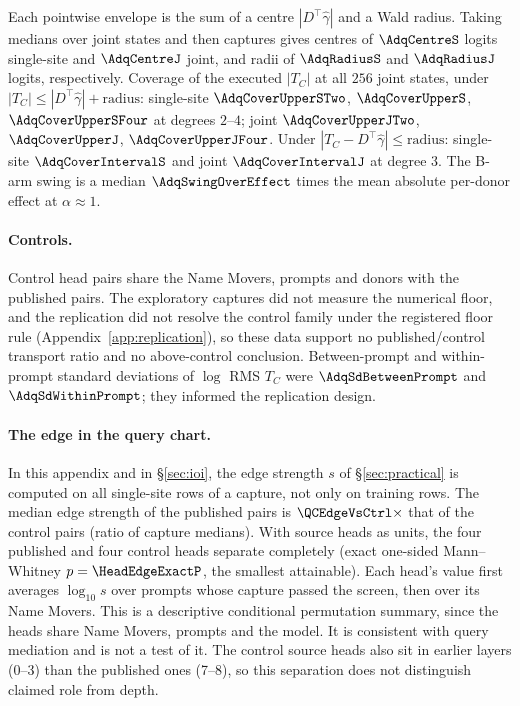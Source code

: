 Each pointwise envelope is the sum of a centre $|D^\top\hat\gamma|$ and a Wald radius. Taking medians over
joint states and then captures gives centres of $\AdqCentreS$ logits single-site and $\AdqCentreJ$ joint,
and radii of $\AdqRadiusS$ and $\AdqRadiusJ$ logits, respectively. Coverage of the executed $|T_C|$
at all $256$ joint states, under $|T_C|\le|D^\top\hat\gamma|+\text{radius}$: single-site $\AdqCoverUpperSTwo$,
$\AdqCoverUpperS$, $\AdqCoverUpperSFour$ at degrees $2$--$4$; joint $\AdqCoverUpperJTwo$, $\AdqCoverUpperJ$,
$\AdqCoverUpperJFour$. Under $|T_C-D^\top\hat\gamma|\le\text{radius}$: single-site $\AdqCoverIntervalS$ and joint
$\AdqCoverIntervalJ$ at degree $3$. The B-arm swing is a median $\AdqSwingOverEffect$ times the mean absolute per-donor
effect at $\alpha\approx1$.

\paragraph{Controls.} Control head pairs share the Name Movers, prompts and donors with the published pairs. The
exploratory captures did not measure the numerical floor, and the replication did not resolve the control family
under the registered floor rule (Appendix~\ref{app:replication}), so these data support no published/control
transport ratio and no above-control conclusion. Between-prompt and within-prompt standard deviations of $\log$ RMS
$T_C$ were $\AdqSdBetweenPrompt$ and $\AdqSdWithinPrompt$; they informed the replication design.

\paragraph{The edge in the query chart.} In this appendix and in \S\ref{sec:ioi}, the edge strength $s$ of
\S\ref{sec:practical} is computed on all single-site rows of a capture, not only on training rows. The median edge
strength of the published pairs is $\QCEdgeVsCtrl\times$ that of the control pairs (ratio of capture medians). With source heads as units, the four published and four control heads separate completely
(exact one-sided Mann--Whitney $p=\HeadEdgeExactP$, the smallest attainable). Each head's value first averages
$\log_{10}s$ over prompts whose capture passed the screen, then over its Name Movers. This is a descriptive
conditional permutation summary, since the heads share Name Movers, prompts and the model. It is
consistent with query mediation and is not a test of it. The control source heads also sit in earlier layers (0--3) than the published ones (7--8), so this separation does not distinguish claimed role from depth.

